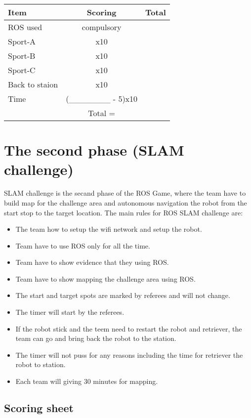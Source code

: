 \documentclass[10pt,a4paper]{article}
\begin{document}
		\begin{table}[ht]
		\begin{tabular}{|l|c|r|}
			\hline
			Item & Scoring & Total \\ 
			\hline
			ROS used & compulsory &  \\ 
			\hline
			Sport-A & x10 &  \\ 
			\hline
			Sport-B & x10 &  \\ 
			\hline
			Sport-C & x10 &  \\ 
			\hline
			Back to staion & x10 &  \\ 
			\hline
			Time & (\_\_\_\_\_\_\_ - 5)x10 &  \\ 
			\hline
			& Total  = & \\
			\hline
		\end{tabular} 
		\end{table}		
	
	
		\section{The second phase (SLAM challenge)}
		
		SLAM challenge is the secand phase of the ROS Game, where the team have to build map for the challenge area and autonomous navigation the robot from the start stop to the target location.
		The main rules for ROS SLAM challenge are:
		\begin{itemize}
			\item The team how to setup the wifi network and setup the robot.
			\item Team have to use ROS only for all the time.
			\item Team have to show evidence that they using ROS.
			\item Team have to show mapping the challenge area using ROS.			 
			\item The start and target spots are marked by referees and will not change.
			\item The timer will start by the referees.
			\item If the robot stick and the teem need to restart the robot and retriever, the team can go and bring back the robot to the station.
			\item The timer will not puss for any reasons including the time for retriever the robot to station.
			\item Each team will giving 30 minutes for mapping.
		\end{itemize}
		
		\subsection{Scoring sheet}
		
\end{document}
